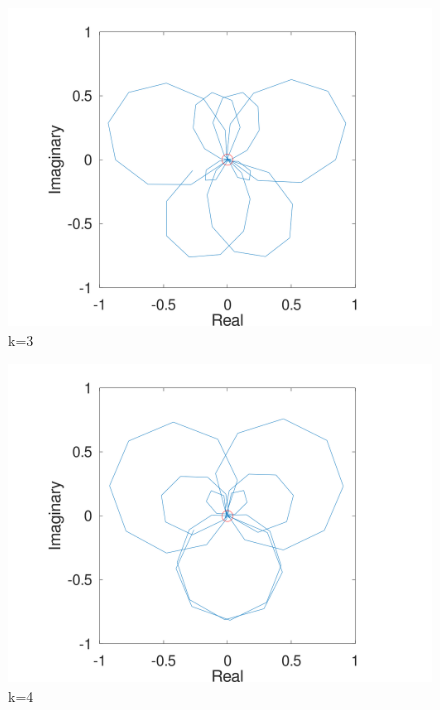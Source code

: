 \documentclass{article}
\begin{document}
\begin{figure}
\includegraphics[width=1\linewidth]{fourier5.png}
\caption{k=3}
\end{figure}

\begin{figure}
\includegraphics[width=1\linewidth]{fourier6.png}
\caption{k=4}
\end{figure}
\end{document}
